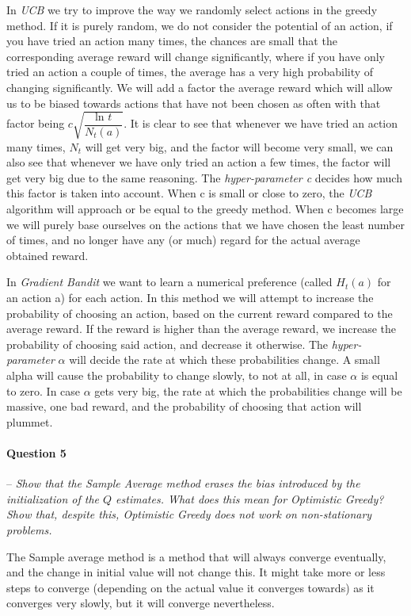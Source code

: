 \documentclass[a4paper]{article}
\newcommand{\question}[2]{
\paragraph{Question #1} -- \textit{#2}

}
\begin{document}
In \textit{UCB} we try to improve the way we randomly select actions in the greedy method. If it is purely random, we do not consider the potential of an action, if you have tried an action many times, the chances are small that the corresponding average reward will change significantly, where if you have only tried an action a couple of times, the average has a very high probability of changing significantly. We will add a factor the average reward which will allow us to be biased towards actions that have not been chosen as often with that factor being $c\sqrt{\dfrac{\text{ln } t}{N_t(a)}}$. It is clear to see that whenever we have tried an action many times, $N_t$ will get very big, and the factor will become very small, we can also see that whenever we have only tried an action a few times, the factor will get very big due to the same reasoning. The \textit{hyper-parameter c} decides how much this factor is taken into account. When c is small or close to zero, the \textit{UCB} algorithm will approach or be equal to the greedy method. When c becomes large we will purely base ourselves on the actions that we have chosen the least number of times, and no longer have any (or much) regard for the actual average obtained reward.

In \textit{Gradient Bandit} we want to learn a numerical preference (called $H_t(a)$ for an action a) for each action. In this method we will attempt to increase the probability of choosing an action, based on the current reward compared to the average reward. If the reward is higher than the average reward, we increase the probability of choosing said action, and decrease it otherwise. The \textit{hyper-parameter} $\alpha$ will decide the rate at which these probabilities change. A small alpha will cause the probability to change slowly, to not at all, in case $\alpha$ is equal to zero. In case $\alpha$ gets very big, the rate at which the probabilities change will be massive, one bad reward, and the probability of choosing that action will plummet. 

\question{5}{Show that the Sample Average method erases the bias introduced by the initialization of the $Q$ estimates. What does this mean for Optimistic Greedy? Show that, despite this, Optimistic Greedy does not work on non-stationary problems.}
The Sample average method is a method that will always converge eventually, and the change in initial value will not change this. It might take more or less steps to converge (depending on the actual value it converges towards) as it converges very slowly, but it will converge nevertheless. 
\end{document}
